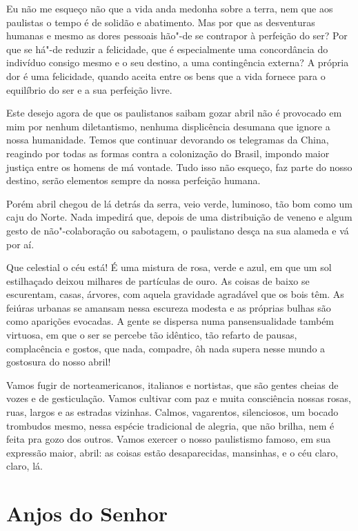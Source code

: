 Eu não me esqueço não que a vida anda medonha sobre a terra, nem que aos
paulistas o tempo é de solidão e abatimento. Mas por que as desventuras
humanas e mesmo as dores pessoais hão"-de se contrapor à perfeição do
ser? Por que se há"-de reduzir a felicidade, que é especialmente uma
concordância do indivíduo consigo mesmo e o seu destino, a uma
contingência externa? A própria dor é uma felicidade, quando aceita
entre os bens que a vida fornece para o equilíbrio do ser e a sua
perfeição livre.

Este desejo agora de que os paulistanos saibam gozar abril não é
provocado em mim por nenhum diletantismo, nenhuma displicência desumana
que ignore a nossa humanidade. Temos que continuar devorando os
telegramas da China, reagindo por todas as formas contra a colonização
do Brasil, impondo maior justiça entre os homens de má vontade. Tudo
isso não esqueço, faz parte do nosso destino, serão elementos sempre da
nossa perfeição humana.

Porém abril chegou de lá detrás da serra, veio verde, luminoso, tão bom
como um caju do Norte. Nada impedirá que, depois de uma distribuição de
veneno e algum gesto de não"-colaboração ou sabotagem, o paulistano desça
na sua alameda e vá por aí.

Que celestial o céu está! É uma mistura de rosa, verde e azul, em que um
sol estilhaçado deixou milhares de partículas de ouro. As coisas de
baixo se escurentam, casas, árvores, com aquela gravidade agradável que
os bois têm. As feiúras urbanas se amansam nessa escureza modesta e as
próprias bulhas são como aparições evocadas. A gente se dispersa numa
pansensualidade também virtuosa, em que o ser se percebe tão idêntico,
tão refarto de pausas, complacência e gostos, que nada, compadre, ôh
nada supera nesse mundo a gostosura do nosso abril!

Vamos fugir de norteamericanos, italianos e nortistas, que são gentes
cheias de vozes e de gesticulação. Vamos cultivar com paz e muita
consciência nossas rosas, ruas, largos e as estradas vizinhas. Calmos,
vagarentos, silenciosos, um bocado trombudos mesmo, nessa espécie
tradicional de alegria, que não brilha, nem é feita pra gozo dos outros.
Vamos exercer o nosso paulistismo famoso, em sua expressão maior, abril:
as coisas estão desaparecidas, mansinhas, e o céu claro, claro, lá.

\chapter{Anjos do Senhor}

